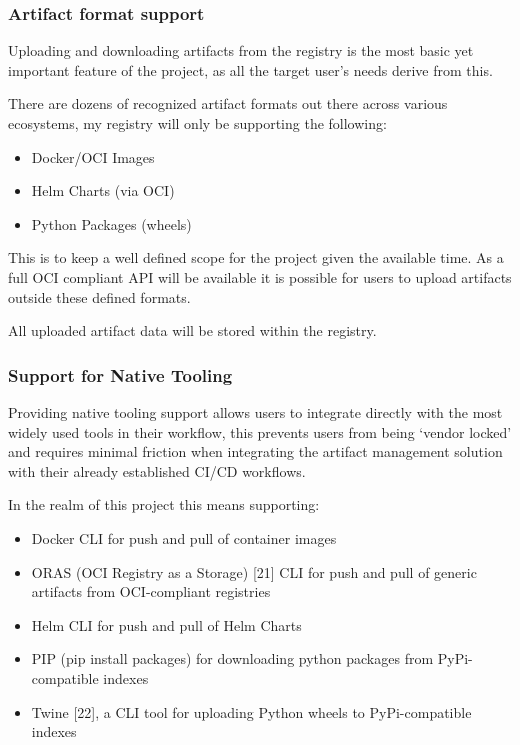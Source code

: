 \documentclass{article}
\begin{document}
  \subsubsection{Artifact format support}

  Uploading and downloading artifacts from the registry is the most basic yet important feature of the project, as all the target user's needs derive from this.

  There are dozens of recognized artifact formats out there across various ecosystems, my registry will only be supporting the following:

  \begin{itemize}
    \item Docker/OCI Images
    \item Helm Charts (via OCI)
    \item Python Packages (wheels)
  \end{itemize}

  This is to keep a well defined scope for the project given the available time. As a full OCI compliant API will be available it is possible for users to upload artifacts outside these defined formats.

  All uploaded artifact data will be stored within the registry.

  \subsubsection{Support for Native Tooling}

  Providing native tooling support allows users to integrate directly with the most widely used tools in their workflow, this prevents users from being `vendor locked' and requires minimal friction when integrating the artifact management solution with their already established CI/CD workflows.

  In the realm of this project this means supporting:

  \begin{itemize}
    \item Docker CLI for push and pull of container images
    \item ORAS (OCI Registry as a Storage) [21] CLI for push and pull of generic artifacts from OCI-compliant registries
    \item Helm CLI for push and pull of Helm Charts
    \item PIP (pip install packages) for downloading python packages from PyPi-compatible indexes
    \item Twine [22], a CLI tool for uploading Python wheels to PyPi-compatible indexes
  \end{itemize}
\end{document}
